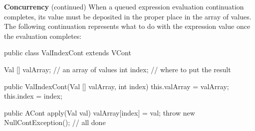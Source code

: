 \begin{minipage}[t]{\sw}
\slidenumber
\LARGE
{\bf Concurrency} (continued)\exx
\LARGE
When a queued expression evaluation continuation completes,
its value must be deposited in the proper place
in the array of values.
The following continuation represents what
to do with the expression value once the evaluation completes:
\Large
\begin{qv}
public class ValIndexCont extends VCont {

    Val [] valArray; // an array of values
    int index;       // where to put the result

    public ValIndexCont(Val [] valArray, int index) {
        this.valArray = valArray;
        this.index = index;
    }

    public ACont apply(Val val) {
        valArray[index] = val;
        throw new NullContException(); // all done
    }

}
\end{qv}
\LARGE
\end{minipage}
